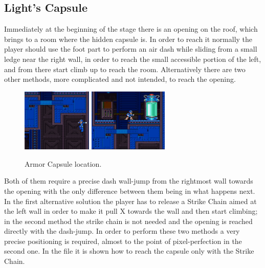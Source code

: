 \subsection{Light's Capsule}\label{X2:Arm_parts}
Immediately at the beginning of the stage there is an opening on the roof, which brings to a room where the hidden capsule is. In order to reach it normally the player should use the foot part to perform an air dash while sliding from a small ledge near the right wall, in order to reach the small accessible portion of the left, and from there start climb up to reach the room. Alternatively there are two other methods, more complicated and not intended, to reach the opening.\begin{figure}[htp]
	\centering
	\includegraphics[height=3cm]{figures/X2/Wheel_gator/Gator_capsule_1.jpg}
	\includegraphics[height=3cm]{figures/X2/Wheel_gator/Gator_capsule_2.jpg}
	\caption{Armor Capsule location.}
\end{figure}
 Both of them require a precise dash wall-jump from the rightmost wall towards the opening with the only difference between them being in what happens next. In the first alternative solution the player has to release a Strike Chain aimed at the left wall in order to make it pull X towards the wall and then start climbing; in the second method the strike chain is not needed and the opening is reached directly with the dash-jump. In order to perform these two methods a very precise positioning is required, almost to the point of pixel-perfection in the second one. In the file  it is shown how to reach the capsule only with the Strike Chain.

